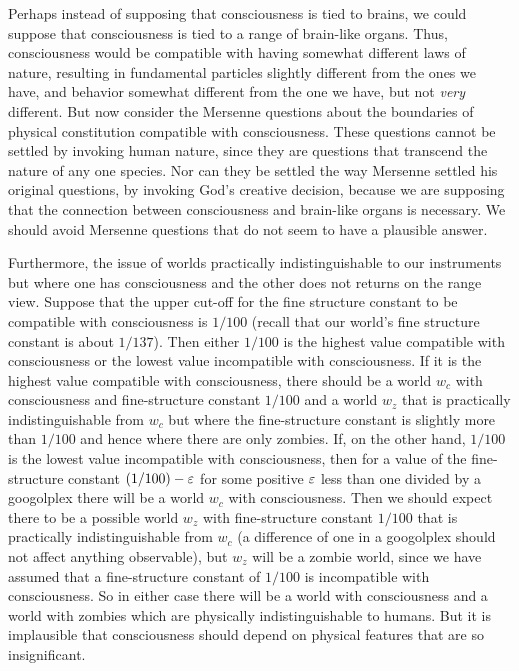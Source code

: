 Perhaps instead of supposing that consciousness is tied to brains, we could suppose that consciousness is tied to a range of brain-like
organs. Thus, consciousness would be compatible with having somewhat different laws of nature, resulting in fundamental particles
slightly different from the ones we have, and behavior somewhat different from the one we have, but not \textit{very} different.
But now consider the Mersenne questions about the boundaries of physical constitution compatible with consciousness. These
questions cannot be settled by invoking human nature, since they are questions that transcend the nature of any one species.
Nor can they be settled the way Mersenne settled his original questions, by invoking God's creative decision, because we are
supposing that the connection between consciousness and brain-like organs is necessary. We should avoid Mersenne questions that
do not seem to have a plausible answer. 

Furthermore, the issue of worlds practically indistinguishable to our instruments but where one has consciousness and the other
does not returns on the range view. Suppose that the upper cut-off for the fine structure constant to be compatible with
consciousness is $1/100$ (recall that our world's fine structure constant is about $1/137$). Then either $1/100$ is the
highest value compatible with consciousness or the lowest value incompatible with consciousness. If it is the highest value
compatible with consciousness, there should be a world $w_c$ with consciousness and fine-structure constant $1/100$ and a 
world $w_z$ that is practically indistinguishable from $w_c$ but where the fine-structure constant is slightly more than 
$1/100$ and hence where there are only zombies. If, on the other hand, $1/100$ is the lowest value incompatible with 
consciousness, then for a value of the fine-structure constant $(1/100)-\varepsilon$ for some positive $\varepsilon$ less than one divided by a 
googolplex there will be a world $w_c$ with consciousness. Then we should expect there to be a possible world $w_z$ with fine-structure constant
$1/100$ that is practically indistinguishable from $w_c$ (a difference of one in a googolplex should not affect anything observable),
but $w_z$ will be a zombie world, since we have assumed that a fine-structure constant of $1/100$ is incompatible with
consciousness. So in either case there will be a world with consciousness and a world with zombies which are physically
indistinguishable to humans.  But it is implausible that consciousness should depend on physical features that are so insignificant.

